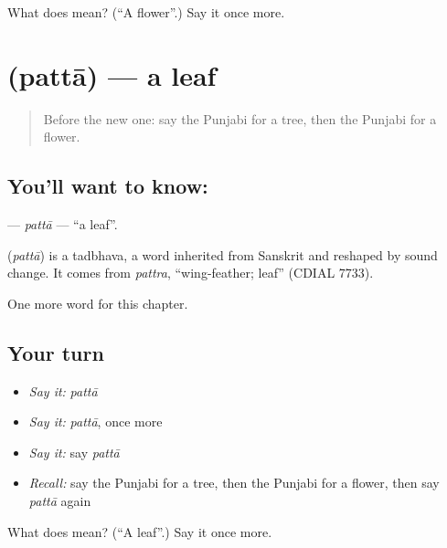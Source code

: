 \begin{tcolorbox}[breakable,colback=teal!4,colframe=teal!35!black,title={Before you move on}]
What does  mean? (\textquotedblleft{}A flower\textquotedblright{}.) Say it once more.
\end{tcolorbox}
\section[\texorpdfstring{\pa{ਪੱਤਾ} (pattā)}{ਪੱਤਾ (pattā)}]{ (pattā) — a leaf}

\label{lesson:PA-C73-patta}



\begin{quote}
Before the new one: say the Punjabi for a tree, then the Punjabi for a flower.
\end{quote}

\subsection*{You'll want to know: }
\textbf{} — \emph{pattā} — \textquotedblleft{}a leaf\textquotedblright{}.

\begin{cousinweb}
\textbf{} (\emph{pattā}) is a tadbhava, a word inherited from Sanskrit and reshaped by sound change. It comes from \emph{pattra}, \textquotedblleft{}wing-feather; leaf\textquotedblright{} (CDIAL 7733).
\end{cousinweb}

\begin{grammarlens}[title={What you've built}]
One more word for this chapter.
\end{grammarlens}

\subsection*{Your turn}
\begin{itemize}
\raggedright
  \item \emph{Say it:} \emph{pattā}
  \item \emph{Say it:} \emph{pattā}, once more
  \item \emph{Say it:} say \emph{pattā}
  \item \emph{Recall:} say the Punjabi for a tree, then the Punjabi for a flower, then say \emph{pattā} again
\end{itemize}

\begin{tcolorbox}[breakable,colback=teal!4,colframe=teal!35!black,title={Before you move on}]
What does  mean? (\textquotedblleft{}A leaf\textquotedblright{}.) Say it once more.
\end{tcolorbox}
